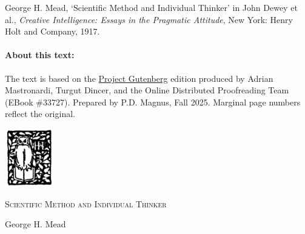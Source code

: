 \documentclass[12pt]{article}
\begin{document}
\setcounter{footnote}{0}

\setlength{\parskip}{4pt}
\setlength{\parindent}{0pt}




George H. Mead, `Scientific Method and Individual Thinker' in John Dewey et al., \emph{Creative Intelligence: Essays in the Pragmatic Attitude}, New York: Henry Holt and Company, 1917.

\newcommand*{\marginpage}[1]{\marginpar{\tiny{#1}}}
\paragraph{About this text:} The text is based on the \href{http://www.gutenberg.org/}{Project Gutenberg} edition produced by Adrian Mastronardi, Turgut Dincer, and the Online Distributed Proofreading Team (EBook \#33727). Prepared by P.D. Magnus, Fall 2025. Marginal page numbers reflect the original.

\begin{center}
\centerline{\includegraphics[height=1in]{creative-intelligence-cover-owl.png}}

\textsc{\Large Scientific Method and Individual Thinker}

George H. Mead
\end{center}


\setlength{\parindent}{0pt}
\marginpage{176}
\end{document}
